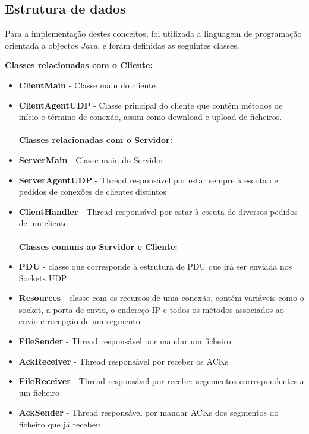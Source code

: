 \documentclass{article}
\begin{document}
\subsection{Estrutura de dados}
Para a implementação destes conceitos, foi utilizada a linguagem de programação orientada a objectos \emph{Java}, e foram definidas as seguintes classes.\\
\par \textbf{Classes relacionadas com o Cliente:}
\begin{itemize}
\item \textbf{ClientMain} - Classe main do cliente
\item \textbf{ClientAgentUDP} - Classe principal do cliente que contém métodos de início e término de conexão, assim como download e upload de ficheiros.\\
\\
\textbf{Classes relacionadas com o Servidor:}
\item \textbf{ServerMain} - Classe main do Servidor
\item \textbf{ServerAgentUDP} - Thread responsável por estar sempre à escuta de pedidos de conexões de clientes distintos
\item \textbf{ClientHandler} - Thread responsável por estar à escuta de diversos pedidos de um cliente\\
\\
\textbf{Classes comuns ao Servidor e Cliente:}
\item \textbf{PDU} - classe que corresponde à estrutura de PDU que irá ser enviada nos Sockets UDP
\item \textbf{Resources} - classe com os recursos de uma conexão, contém variáveis como o socket, a porta de envio, o endereço IP e todos os métodos associados ao envio e recepção de um segmento
\item \textbf{FileSender} - Thread responsável por mandar um ficheiro
\item \textbf{AckReceiver} - Thread responsável por receber os ACKs 
\item \textbf{FileReceiver} - Thread responsável por receber segementos correspondentes a um ficheiro
\item \textbf{AckSender} - Thread responsável por mandar ACKs dos segmentos do ficheiro que já recebeu
\end{itemize}
\end{document}
